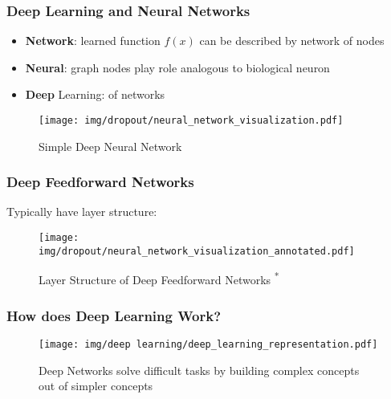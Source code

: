 \documentclass{beamer}
\begin{document}
\begin{frame}
    \frametitle{Deep Learning and Neural Networks}
    \begin{itemize}
        \item \textbf{Network}: learned function $f(x)$ can be described by network of nodes
        \item \textbf{Neural}: graph nodes play role analogous to biological neuron
        \item \textbf{Deep} Learning:  of networks
    \end{itemize}

    \begin{figure}
        \texttt{[image: img/dropout/neural\_network\_visualization.pdf]}
        \caption{Simple Deep Neural Network \cite{dropout}}
    \end{figure}
\end{frame}

\begin{frame}
    \frametitle{Deep Feedforward Networks}
    Typically have layer structure:
    \begin{figure}
        \texttt{[image: img/dropout/neural\_network\_visualization\_annotated.pdf]}
        \caption{Layer Structure of Deep Feedforward Networks \cite{dropout}\textsuperscript{*}}
    \end{figure}
\end{frame}

\begin{frame}
    \frametitle{How does Deep Learning Work?}
    \begin{figure}
        \begin{minipage}[c]{0.67\textwidth}
          \texttt{[image: img/deep learning/deep\_learning\_representation.pdf]}
        \end{minipage}\hfill
        \begin{minipage}[c]{0.3\textwidth}
          \caption{
            Deep Networks solve difficult tasks by building complex concepts out of simpler concepts \cite{textbook}
          } \label{fig:03-03}
        \end{minipage}
      \end{figure}
\end{frame}
\end{document}
